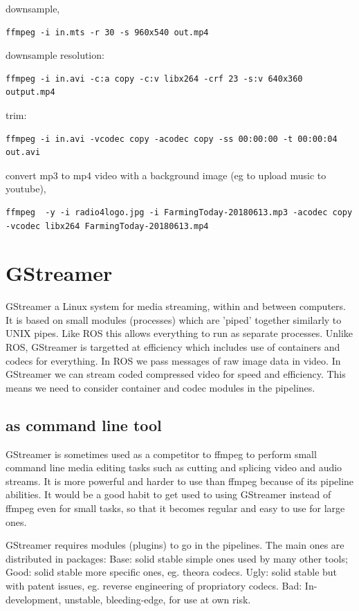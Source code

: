 \documentclass[oneside,english]{scrbook}
\begin{document}
downsample,
\begin{lstlisting}
ffmpeg -i in.mts -r 30 -s 960x540 out.mp4
\end{lstlisting}

downsample resolution: 
\begin{lstlisting}
ffmpeg -i in.avi -c:a copy -c:v libx264 -crf 23 -s:v 640x360 output.mp4
\end{lstlisting}

trim:
\begin{lstlisting}
ffmpeg -i in.avi -vcodec copy -acodec copy -ss 00:00:00 -t 00:00:04 out.avi
\end{lstlisting}

convert mp3 to mp4 video with a background image (eg to upload music to youtube),
\begin{lstlisting}
ffmpeg  -y -i radio4logo.jpg -i FarmingToday-20180613.mp3 -acodec copy -vcodec libx264 FarmingToday-20180613.mp4
\end{lstlisting}

\chapter{GStreamer}

GStreamer a Linux system for media streaming, within and between computers. It is based on small modules (processes) which are 'piped' together similarly to UNIX pipes.  Like ROS this allows everything to run as separate processes. Unlike ROS, GStreamer is targetted at efficiency which includes use of containers and codecs for everything. In ROS we pass messages of raw image data in video. In GStreamer we can stream coded compressed video for speed and efficiency.  This means we need to consider container and codec modules in the pipelines.

\section{as command line tool}

GStreamer is sometimes used as a competitor to ffmpeg to perform small command line media editing tasks such as cutting and splicing video and audio streams. It is more powerful and harder to use than ffmpeg because of its pipeline abilities.  It would be a good habit to get used to using GStreamer instead of ffmpeg even for small tasks, so that it becomes regular and easy to use for large ones.

GStreamer requires modules (plugins) to go in the pipelines. The main ones are distributed in packages:
 Base: solid stable simple ones used by many other tools;
 Good: solid stable more specific ones, eg. theora codecs.
 Ugly: solid stable but with patent issues, eg. reverse engineering of propriatory codecs.
 Bad: In-development, unstable, bleeding-edge, for use at own risk.
\end{document}

